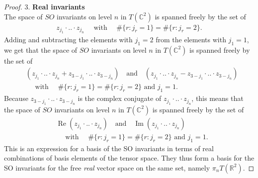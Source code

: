\documentclass{scrartcl}
\theoremstyle{plain}
\theoremstyle{definition}
\newcommand{\R}{\mathbb{R}}
\newcommand{\C}{\mathbb{C}}
\newcommand{\1}[1]{1_{\{#1\}}}
\begin{document}
\begin{proof}
  3. \textbf{Real invariants}\\
	The space of $SO$ invariants on level $n$ in $T(\C^2)$ is spanned freely by the set of
	\begin{align*}
	z_{j_1} \cdot .. \cdot z_{j_n} \quad \text{ with } \quad \#\{ r : j_r = 1 \} = \#\{ r : j_r = 2 \}.
	\end{align*}
	Adding and subtracting the elements with $j_1=2$ from the elements with $j_1=1$, we get that the space of $SO$ invariants on level $n$ in $T(\C^2)$ is spanned freely by the set of
	\begin{align*}
	 & (z_{j_1} \cdot .. \cdot z_{j_n} + z_{3-j_1} \cdot .. \cdot z_{3-j_n}) \quad\text{and}\quad (z_{j_1} \cdot .. \cdot z_{j_n} - z_{3-j_1} \cdot .. \cdot z_{3-j_n}) 
	 \\&\quad \text{ with } \quad \#\{ r : j_r = 1 \} = \#\{ r : j_r = 2 \}\text{ and $j_1=1$}.
	\end{align*}
	Because $z_{3-j_1} \cdot .. \cdot z_{3-j_n}$ is the complex conjugate of $z_{j_1} \cdot .. \cdot z_{j_n}$, this means that the space of $SO$ invariants on level $n$ in $T(\C^2)$ is spanned freely by the set of
		\begin{align*}
	& \operatorname{Re}(z_{j_1} \cdot .. \cdot z_{j_n}) \quad\text{and}\quad \operatorname{Im}(z_{j_1} \cdot .. \cdot z_{j_n}) 
	\\&\quad \text{ with } \quad \#\{ r : j_r = 1 \} = \#\{ r : j_r = 2 \}\text{ and $j_1=1$}.
	\end{align*}
	This is an expression for a basis of the SO invariants in terms of real combinations of basis elements of the tensor space. They thus form a basis for the SO invariants for the free \emph{real} vector space on the same set, namely $\pi_n T(\R^2)$.
\end{proof}
\end{document}
